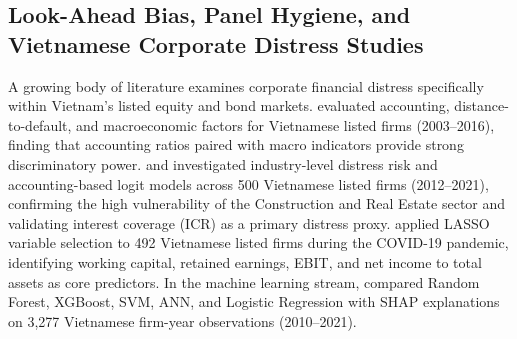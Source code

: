 \documentclass[11pt,a4paper]{article}
\begin{document}
\subsection{Look-Ahead Bias, Panel Hygiene, and Vietnamese Corporate Distress Studies}
A growing body of literature examines corporate financial distress specifically within Vietnam's listed equity and bond markets. \citet{pham2018financial} evaluated accounting, distance-to-default, and macroeconomic factors for Vietnamese listed firms (2003--2016), finding that accounting ratios paired with macro indicators provide strong discriminatory power. \citet{vo2019corporate} and \citet{tran2023examining} investigated industry-level distress risk and accounting-based logit models across 500 Vietnamese listed firms (2012--2021), confirming the high vulnerability of the Construction and Real Estate sector and validating interest coverage ($\text{ICR}$) as a primary distress proxy. \citet{vu2023lasso} applied LASSO variable selection to 492 Vietnamese listed firms during the COVID-19 pandemic, identifying working capital, retained earnings, EBIT, and net income to total assets as core predictors. In the machine learning stream, \citet{tran2022explainable} compared Random Forest, XGBoost, SVM, ANN, and Logistic Regression with SHAP explanations on 3,277 Vietnamese firm-year observations (2010--2021).
\end{document}
